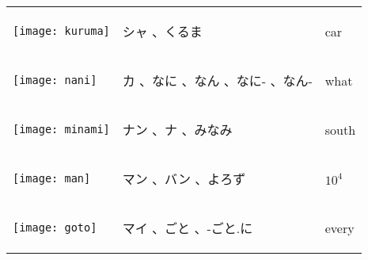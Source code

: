\documentclass[a4paper,12pt]{extarticle}
\begin{document}
\begin{longtable}{|lp{6cm}p{4cm}|}
\begin{minipage}{0.3\textwidth}
\centerline{
	\texttt{[image: kuruma]}
}
\end{minipage}
&
\begin{CJK}{UTF8}{min} シャ 、くるま\end{CJK}
&
 car
\\ 
\begin{minipage}{0.3\textwidth}
\centerline{
	\texttt{[image: nani]}
}
\end{minipage}
&
\begin{CJK}{UTF8}{min} カ 、なに 、なん 、なに- 、なん-\end{CJK}
&
 what
\\ 
\begin{minipage}{0.3\textwidth}
\centerline{
	\texttt{[image: minami]}
}
\end{minipage}
&
\begin{CJK}{UTF8}{min} ナン 、ナ 、みなみ\end{CJK}
&
 south
\\ 
\begin{minipage}{0.3\textwidth}
\centerline{
	\texttt{[image: man]}
}
\end{minipage}
&
\begin{CJK}{UTF8}{min} マン 、バン 、よろず\end{CJK}
&
 $10^{4}$
\\ 
\begin{minipage}{0.3\textwidth}
\centerline{
	\texttt{[image: goto]}
}
\end{minipage}
&
\begin{CJK}{UTF8}{min} マイ 、ごと 、-ごと.に\end{CJK}
&
 every
\\ 

\end{longtable}
\end{document}
